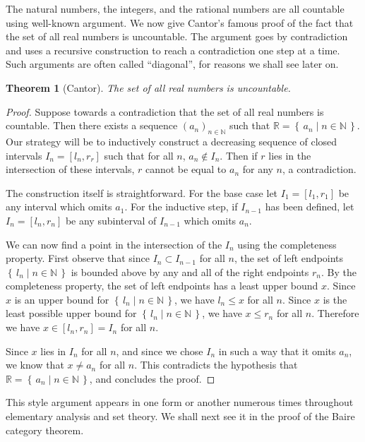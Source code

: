 \documentclass[11pt,oneside]{amsbook}
\newcommand{\set}[1]{\left\{\,#1\,\right\}}
\newcommand{\N}{\mathbb N}
\newcommand{\R}{\mathbb R}
\theoremstyle{definition}
\theoremstyle{plain}
\newtheorem{theorem}{Theorem}[section]
\theoremstyle{definition}
\theoremstyle{remark}
\numberwithin{equation}{section}
\numberwithin{figure}{section}
\begin{document}
The natural numbers, the integers, and the rational numbers are all countable using well-known argument. We now give Cantor's famous proof of the fact that the set of all real numbers is uncountable. The argument goes by contradiction and uses a recursive construction to reach a contradiction one step at a time. Such arguments are often called ``diagonal'', for reasons we shall see later on.

\begin{theorem}[Cantor]
  \label{thm:cantor}
  The set of all real numbers is uncountable.
\end{theorem}

\begin{proof}
  Suppose towards a contradiction that the set of all real numbers is countable. Then there exists a sequence $(a_n)_{n\in\N}$ such that $\R=\set{a_n\mid n\in\N}$. Our strategy will be to inductively construct a decreasing sequence of closed intervals $I_n=[l_n,r_r]$ such that for all $n$, $a_n\notin I_n$. Then if $r$ lies in the intersection of these intervals, $r$ cannot be equal to $a_n$ for any $n$, a contradiction.

The construction itself is straightforward. For the base case let $I_1=[l_1,r_1]$ be any interval which omits $a_1$. For the inductive step, if $I_{n-1}$ has been defined, let $I_n=[l_n,r_n]$ be any subinterval of $I_{n-1}$ which omits $a_n$.

We can now find a point in the intersection of the $I_n$ using the completeness property. First observe that since $I_n\subset I_{n-1}$ for all $n$, the set of left endpoints $\set{l_n\mid n\in\N}$ is bounded above by any and all of the right endpoints $r_n$. By the completeness property, the set of left endpoints has a least upper bound $x$. Since $x$ is an upper bound for $\set{l_n\mid n\in\N}$, we have $l_n\leq x$ for all $n$. Since $x$ is the least possible upper bound for $\set{l_n\mid n\in\N}$, we have $x\leq r_n$ for all $n$. Therefore we have $x\in[l_n,r_n]=I_n$ for all $n$.

Since $x$ lies in $I_n$ for all $n$, and since we chose $I_n$ in such a way that it omits $a_n$, we know that $x\neq a_n$ for all $n$. This contradicts the hypothesis that $\R=\set{a_n\mid n\in\N}$, and concludes the proof.
\end{proof}

This style argument appears in one form or another numerous times throughout elementary analysis and set theory. We shall next see it in the proof of the Baire category theorem.
\end{document}
